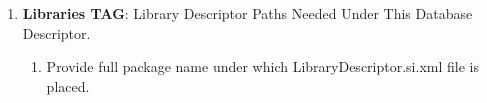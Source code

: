 \begin{enumerate}
\begin{enumerate}
\begin{center}
{{\begin{enumerate}
						\end{enumerate}

					\vspace*{0.0cm} %
				}
			}

			\end{center}
		\end{enumerate}

	\item \small \textbf{Libraries TAG}: Library Descriptor Paths Needed Under This Database Descriptor.

		\begin{enumerate}

			\item \small Provide full package name under which LibraryDescriptor.si.xml file is placed.

		\end{enumerate}


\end{enumerate}



